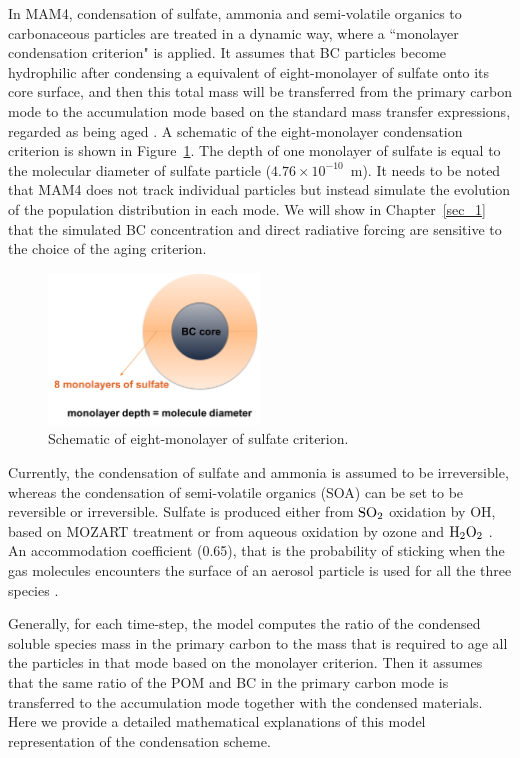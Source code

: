 \documentclass[12pt, fullpage]{uiucthesis2009}
\begin{document}
	In MAM4, condensation of sulfate, ammonia and semi-volatile organics to carbonaceous particles are treated in a dynamic way, where a ``monolayer condensation criterion" is applied. It assumes that BC particles become hydrophilic after condensing a equivalent of eight-monolayer of sulfate onto its core surface, and then this total mass will be transferred from the primary carbon mode to the accumulation mode based on the standard mass transfer expressions, regarded as being aged \citep{Liu2012}. A schematic of the eight-monolayer condensation criterion is shown in Figure~\ref{fig_P3}. The depth of one monolayer of sulfate is equal to the molecular diameter of sulfate particle ($4.76\times 10^{-10}$~m). It needs to be noted that MAM4 does not track individual particles but instead simulate the evolution of the population distribution in each mode. We will show in Chapter~\ref{sec_1} that the simulated BC concentration and direct radiative forcing are sensitive to the choice of the aging criterion.
	\begin{figure}[h] 
		\begin{center}
			\includegraphics[width = 0.5\textwidth]{Figure03}
			\caption[Schematic of eight-monolayer of sulfate criterion]{\label{fig_P3} Schematic of eight-monolayer of sulfate criterion.}
		\end{center}
	\end{figure}
	
	Currently, the condensation of sulfate and ammonia is assumed to be irreversible, whereas the condensation of semi-volatile organics (SOA) can be set to be reversible or irreversible. Sulfate is produced either from $\rm{SO}_{2}$ oxidation by OH, based on MOZART treatment or from aqueous oxidation by ozone and $\rm H_{2}O_{2}$ \citep{tie2001effects}. An accommodation coefficient (0.65), that is the probability of sticking when the gas molecules encounters the surface of an aerosol particle is used for all the three species \citep{Liu2012}. 
	
	Generally, for each time-step, the model computes the ratio of the condensed soluble species mass in the primary carbon to the mass that is required to age all the particles in that mode based on the monolayer criterion. Then it assumes that the same ratio of the POM and BC in the primary carbon mode is transferred to the accumulation mode together with the condensed materials. Here we provide a detailed mathematical explanations of this model representation of the condensation scheme. 
	
\end{document}
